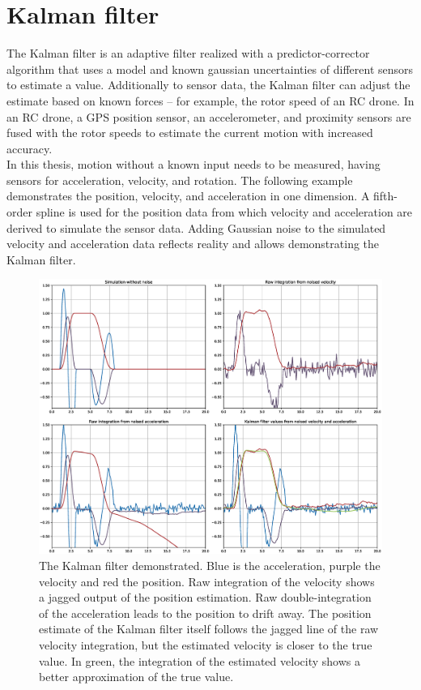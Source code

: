 \section{Kalman filter}
\label{sec:Kalmanfilter}
The Kalman filter is an adaptive filter realized with a predictor-corrector algorithm that uses a model and known gaussian uncertainties of different sensors to estimate a value. Additionally to sensor data, the Kalman filter can adjust the estimate based on known forces – for example, the rotor speed of an RC drone. In an RC drone, a GPS position sensor, an accelerometer, and proximity sensors are fused with the rotor speeds to estimate the current motion with increased accuracy.\\
In this thesis, motion without a known input needs to be measured, having sensors for acceleration, velocity, and rotation. The following example demonstrates the position, velocity, and acceleration in one dimension. A fifth-order spline is used for the position data from which velocity and acceleration are derived to simulate the sensor data. Adding Gaussian noise to the simulated velocity and acceleration data reflects reality and allows demonstrating the Kalman filter.
\begin{figure}[H]
    \centering
    \includegraphics[width=1.0\textwidth]{images/Kalman_example_1d.eps}
    \caption{The Kalman filter demonstrated. Blue is the acceleration, purple the velocity and red the position. Raw integration of the velocity shows a jagged output of the position estimation. Raw double-integration of the acceleration leads to the position to drift away. The position estimate of the Kalman filter itself follows the jagged line of the raw velocity integration, but the estimated velocity is closer to the true value. In green, the integration of the estimated velocity shows a better approximation of the true value.}
    \label{im:KalmanFilter1D}
\end{figure}
